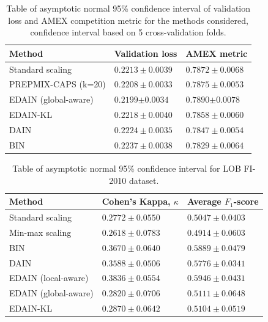 \documentclass{statsmsc}
\begin{document}
\begin{table}
    \centering
    \begin{tabular}{lll}
        \toprule
        Method & Validation loss & AMEX metric \\
        \midrule
        Standard scaling & $0.2213 \pm 0.0039$ & $0.7872 \pm 0.0068$ \\
        PREPMIX-CAPS (k=20) & $0.2208 \pm 0.0033$ & $0.7875 \pm 0.0053$ \\
        EDAIN (global-aware) & $\mathbf{0.2199} \bm\pm \mathbf{0.0034}$ & $\mathbf{0.7890} \bm\pm \mathbf{0.0078}$ \\
        EDAIN-KL & $0.2218 \pm 0.0040$ & $0.7858 \pm 0.0060$ \\
        DAIN & $0.2224 \pm 0.0035$ & $0.7847 \pm 0.0054$ \\
        BIN & $0.2237 \pm 0.0038$ & $0.7829 \pm 0.0064$ \\
        \bottomrule
    \end{tabular}%
    \label{tab:amex}%
    \caption{Table of asymptotic normal 95\% confidence interval of validation loss and
    AMEX competition metric for the methods considered, confidence interval based on 5 cross-validation folds.}
\end{table}

\begin{table}
    \centering
    \begin{tabular}{lll}
        \toprule
        Method & Cohen's Kappa, $\kappa$ & Average $F_1$-score \\
        \midrule
        Standard scaling & $0.2772 \pm 0.0550$ & $0.5047 \pm 0.0403$ \\
        Min-max scaling & $0.2618 \pm 0.0783$ & $0.4914 \pm 0.0603$ \\
        BIN & $0.3670 \pm 0.0640$ & $0.5889 \pm 0.0479$ \\
        DAIN & $0.3588 \pm 0.0506$ & $0.5776 \pm 0.0341$ \\
        EDAIN (local-aware) & $\bm{0.3836 \pm 0.0554}$ & $\bm{0.5946 \pm 0.0431}$ \\
        EDAIN (global-aware) & $0.2820 \pm 0.0706$ & $0.5111 \pm 0.0648$ \\
        EDAIN-KL & $0.2870 \pm 0.0642$ & $0.5104 \pm 0.0519$ \\
        \bottomrule
    \end{tabular}%
    \label{tab:lob}%
    \caption{Table of asymptotic normal 95\% confidence interval for LOB FI-2010 dataset.}
\end{table}
\end{document}

